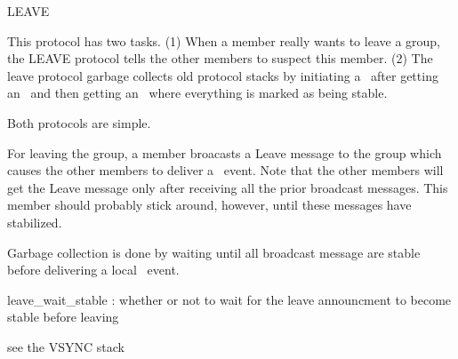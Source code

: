 %
%
%
\begin{Layer}{LEAVE}

This protocol has two tasks.  (1) When a member really wants to leave a group,
the LEAVE protocol tells the other members to suspect this member.  (2) The
leave protocol garbage collects old protocol stacks by initiating a \DnLeave\
after getting an \UpView\ and then getting an \UpStable\ where everything is
marked as being stable.

\begin{Protocol}
Both protocols are simple.

For leaving the group, a member broacasts a Leave message to the group
which causes the other members to deliver a \DnSuspect\ event.  Note that
the other members will get the Leave message only after receiving all the
prior broadcast messages.  This member should probably stick around,
however, until these messages have stabilized.

Garbage collection is done by waiting until all broadcast message are
stable before delivering a local \DnLeave\ event.
\end{Protocol}

\begin{Parameters}
\item
leave\_wait\_stable : whether or not to wait for the leave announcment to
become stable before leaving
\end{Parameters}

\begin{Properties}
\item \todo{}
\end{Properties}

\begin{Sources}
\end{Sources}

\begin{GenEvent}
\genevent{\DnLeave}
\end{GenEvent}

\begin{Testing}
\item see the VSYNC stack
\end{Testing}
\end{Layer}
